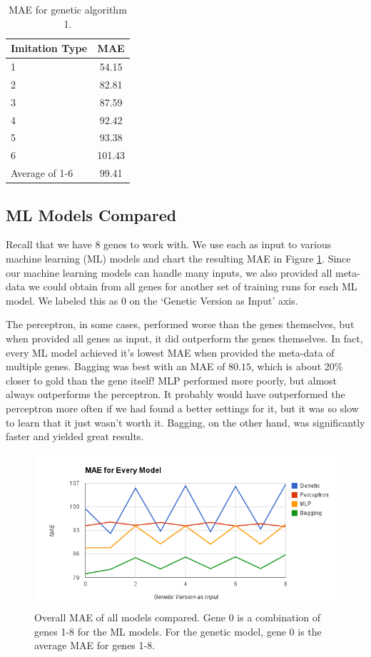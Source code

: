 \begin{table}[center]
	\centering
	\begin{center}
		\begin{tabular}{|l|c|} \hline
			\textbf{Imitation Type}	&	{MAE}		\\ \hline \hline
			1			&	54.15		\\ \hline
			2			&	82.81		\\ \hline
			3			&	87.59		\\ \hline
			4			&	92.42		\\ \hline
			5			&	93.38		\\ \hline
			6			&	101.43		\\ \hline
			Average of 1-6		&	99.41		\\ \hline
		\end{tabular}
	\end{center}
	\caption{MAE for genetic algorithm 1.}
	\label{tab:best-for-each}
\end{table}

\clearpage

\subsection{ML Models Compared}
Recall that we have 8 genes to work with. We use each as input to various machine learning (ML) models and chart the resulting MAE in Figure \ref{fig:mae_by_type}. Since our machine learning models can handle many inputs, we also provided all meta-data we could obtain from all genes for another set of training runs for each ML model. We labeled this as 0 on the `Genetic Version as Input' axis. 

The perceptron, in some cases, performed worse than the genes themselves, but when provided all genes as input, it did outperform the genes themselves. In fact, every ML model achieved it's lowest MAE when provided the meta-data of multiple genes. Bagging was best with an MAE of $80.15$, which is about 20\% closer to gold than the gene itself! MLP performed more poorly, but almost always outperforms the perceptron. It probably would have outperformed the perceptron more often if we had found a better settings for it, but it was so slow to learn that it just wasn't worth it. Bagging, on the other hand, was significantly faster and yielded great results.

\begin{figure}[center]
	\centering
	\includegraphics[width=16cm]{images/MAE_by_type.png}
	\caption{Overall MAE of all models compared. Gene 0 is a combination of genes 1-8 for the ML models. For the genetic model, gene 0 is the average MAE for genes 1-8.}
	\label{fig:mae_by_type}
\end{figure}
